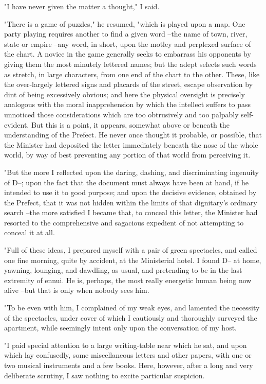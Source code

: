 \documentclass{article}
\begin{document}
"I have never given the matter a thought," I said.

"There is a game of puzzles," he resumed, "which is played upon a map. One party playing requires another to find a given word --the name of town, river, state or empire --any word, in short, upon the motley and perplexed surface of the chart. A novice in the game generally seeks to embarrass his opponents by giving them the most minutely lettered names; but the adept selects such words as stretch, in large characters, from one end of the chart to the other. These, like the over-largely lettered signs and placards of the street, escape observation by dint of being excessively obvious; and here the physical oversight is precisely analogous with the moral inapprehension by which the intellect suffers to pass unnoticed those considerations which are too obtrusively and too palpably self-evident. But this is a point, it appears, somewhat above or beneath the understanding of the Prefect. He never once thought it probable, or possible, that the Minister had deposited the letter immediately beneath the nose of the whole world, by way of best preventing any portion of that world from perceiving it.

"But the more I reflected upon the daring, dashing, and discriminating ingenuity of D--; upon the fact that the document must always have been at hand, if he intended to use it to good purpose; and upon the decisive evidence, obtained by the Prefect, that it was not hidden within the limits of that dignitary's ordinary search --the more satisfied I became that, to conceal this letter, the Minister had resorted to the comprehensive and sagacious expedient of not attempting to conceal it at all.

"Full of these ideas, I prepared myself with a pair of green spectacles, and called one fine morning, quite by accident, at the Ministerial hotel. I found D-- at home, yawning, lounging, and dawdling, as usual, and pretending to be in the last extremity of ennui. He is, perhaps, the most really energetic human being now alive --but that is only when nobody sees him.

"To be even with him, I complained of my weak eyes, and lamented the necessity of the spectacles, under cover of which I cautiously and thoroughly surveyed the apartment, while seemingly intent only upon the conversation of my host.

"I paid special attention to a large writing-table near which he sat, and upon which lay confusedly, some miscellaneous letters and other papers, with one or two musical instruments and a few books. Here, however, after a long and very deliberate scrutiny, I saw nothing to excite particular suspicion.
\end{document}
